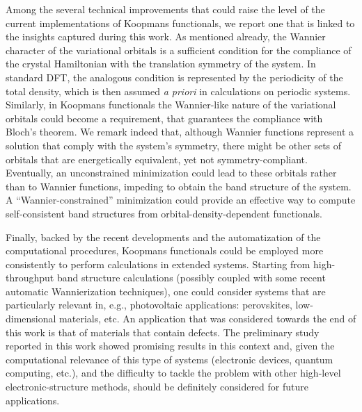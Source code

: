 Among the several technical improvements that could raise the level of the current implementations of Koopmans functionals, we report one that is linked to the insights captured during this work. As mentioned already, the Wannier character of the variational orbitals is a sufficient condition for the compliance of the crystal Hamiltonian with the translation symmetry of the system. In standard DFT, the analogous condition is represented by the periodicity of the total density, which is then assumed \emph{a priori} in calculations on periodic systems. Similarly, in Koopmans functionals the Wannier-like nature of the variational orbitals could become a requirement, that guarantees the compliance with Bloch's theorem. We remark indeed that, although Wannier functions represent a solution that comply with the system's symmetry, there might be other sets of orbitals that are energetically equivalent, yet not symmetry-compliant. Eventually, an unconstrained minimization could lead to these orbitals rather than to Wannier functions, impeding to obtain the band structure of the system. A ``Wannier-constrained'' minimization  could provide an effective way to compute self-consistent band structures from orbital-density-dependent functionals.

Finally, backed by the recent developments and the automatization of the computational procedures, Koopmans functionals could be employed more consistently to perform calculations in extended systems. Starting from high-throughput band structure calculations (possibly coupled with some recent automatic Wannierization techniques), one could consider systems that are particularly relevant in, e.g., photovoltaic applications: perovskites, low-dimensional materials, etc. An application that was considered towards the end of this work is that of materials that contain defects. The preliminary study reported in this work showed promising results in this context and, given the computational relevance of this type of systems (electronic devices, quantum computing, etc.), and the difficulty to tackle the problem with other high-level electronic-structure methods, should be definitely considered for future applications.

